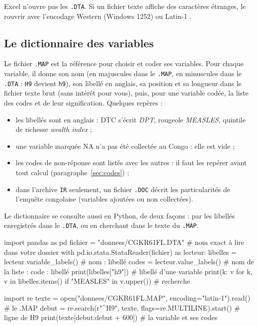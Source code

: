 \documentclass[11pt]{article}
\begin{document}
Excel n'ouvre pas les \texttt{.DTA}. Si un fichier texte affiche des caractères étranges, le rouvrir avec l'encodage \og Western (Windows 1252) \fg{} ou \og Latin-1 \fg{}.

\subsection{Le dictionnaire des variables}

Le fichier \texttt{.MAP} est la référence pour choisir et coder ses variables. Pour chaque variable, il donne son nom (en majuscules dans le \texttt{.MAP}, en minuscules dans le \texttt{.DTA} : \texttt{H9} devient \texttt{h9}), son libellé en anglais, sa position et sa longueur dans le fichier texte brut (sans intérêt pour vous), puis, pour une variable codée, la liste des codes et de leur signification. Quelques repères :
\begin{itemize}
  \item les libellés sont en anglais : DTC s'écrit \emph{DPT}, rougeole \emph{MEASLES}, quintile de richesse \emph{wealth index} ;
  \item une variable marquée \og NA \fg{} n'a pas été collectée au Congo : elle est vide ;
  \item les codes de non-réponse sont listés avec les autres : il faut les repérer avant tout calcul (paragraphe~\ref{sec:codes}) ;
  \item dans l'archive \texttt{IR} seulement, un fichier \texttt{.DOC} décrit les particularités de l'enquête congolaise (variables ajoutées ou non collectées).
\end{itemize}

Le dictionnaire se consulte aussi en Python, de deux façons : par les libellés enregistrés dans le \texttt{.DTA}, ou en cherchant dans le texte du \texttt{.MAP}.
\begin{python}
import pandas as pd
fichier = "donnees/CGKR61FL.DTA"                 # nom exact à lire dans votre dossier
with pd.io.stata.StataReader(fichier) as lecteur:
    libelles = lecteur.variable_labels()         # {nom : libellé}
    codes = lecteur.value_labels()               # {nom de la liste : {code : libellé}}
print(libelles["h9"])                            # libellé d'une variable
print({k: v for k, v in libelles.items() if "MEASLES" in v.upper()})   # recherche

import re
texte = open("donnees/CGKR61FL.MAP", encoding="latin-1").read()        # le .MAP
debut = re.search(r"^H9\s", texte, flags=re.MULTILINE).start()        # ligne de H9
print(texte[debut:debut + 600])                  # la variable et ses codes
\end{python}
\end{document}
